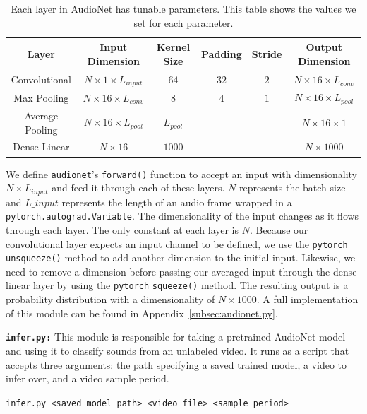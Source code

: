 \documentclass[12pt,twoside]{article}
\theoremstyle{plain}
\theoremstyle{definition}
\theoremstyle{remark}
\begin{document}
\begin{table}[H]
\footnotesize
\centering
\begin{tabular}{ |c|c|c|c|c|c| }
\hline
Layer & Input Dimension & Kernel Size & Padding & Stride & Output Dimension \\
\hline
Convolutional & $N \times 1 \times L_{input}$ & $64$ & $32$ & $2$ & $N \times 16 \times L_{conv}$ \\
Max Pooling & $N \times 16 \times L_{conv}$ & $8$ & $4$ & $1$ & $N \times 16 \times L_{pool}$ \\
Average Pooling & $N \times 16 \times L_{pool}$ & $L_{pool}$ & $-$ & $-$ & $N \times 16 \times 1$ \\
Dense Linear & $N \times 16$ & $1000$ & $-$ & $-$ & $N \times 1000$ \\
\hline
\end{tabular}
{\caption{\footnotesize Each layer in AudioNet has tunable parameters.
          This table shows the values we set for each parameter.}
  \label{tab:layer_properties}}
\end{table}

\noindent
We define \texttt{audionet}'s \texttt{forward()} function to accept an input with dimensionality $N \times L_{input}$ and feed it through each of these layers.
$N$ represents the batch size and $L\_input$ represents the length of an audio frame wrapped in a \texttt{pytorch.autograd.Variable}.
The dimensionality of the input changes as it flows through each layer.
The only constant at each layer is $N$.
Because our convolutional layer expects an input channel to be defined, we use the \texttt{pytorch} \texttt{unsqueeze()} method to add another dimension to the initial input.
Likewise, we need to remove a dimension before passing our averaged input through the dense linear layer by using the \texttt{pytorch} \texttt{squeeze()} method.
The resulting output is a probability distribution with a dimensionality of $N \times 1000$.
A full implementation of this module can be found in Appendix~\ref{subsec:audionet.py}.

\bigskip
\noindent
\textbf{\texttt{infer.py:}}
This module is responsible for taking a pretrained AudioNet model and using it to classify sounds from an unlabeled video.
It runs as a script that accepts three arguments:
the path specifying a saved trained model, a video to infer over, and a video sample period.

\noindent
\begin{center}
\texttt{infer.py <saved\_model\_path> <video\_file> <sample\_period>}
\end{center}
\end{document}
